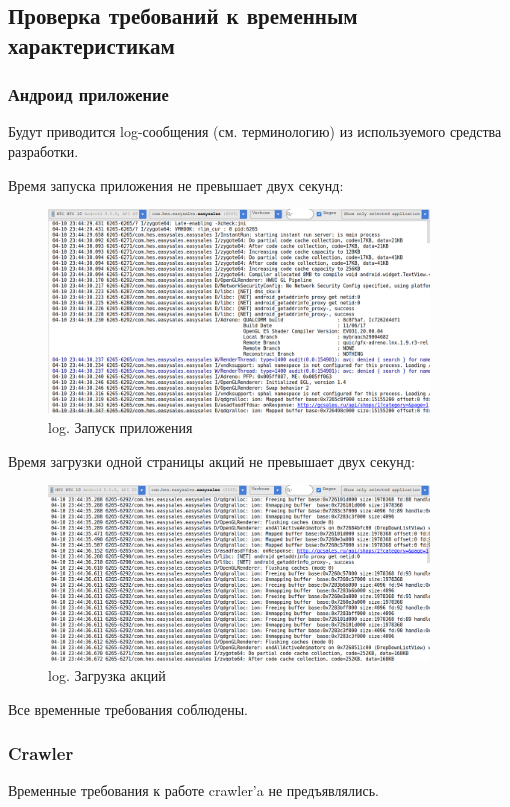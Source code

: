 \newpage
\subsection{Проверка требований к временным характеристикам}
\subsubsection{Андроид приложение}
Будут приводится log-сообщения (см. терминологию) из используемого средства разработки.

Время запуска приложения не превышает двух секунд:

\begin{figure}[h!]
    \centering
    \includegraphics[width=0.9\textwidth]{./screenshots/3/lauch_log.png}
    \caption{\small{log. Запуск приложения}}
\end{figure}


Время загрузки одной страницы акций не превышает двух секунд:

\begin{figure}[h!]
    \centering
    \includegraphics[width=0.9\textwidth]{./screenshots/3/load_log.png}
    \caption{\small{log. Загрузка акций}}
\end{figure}
Все временные требования соблюдены.
\subsubsection{Crawler}
Временные требования к работе crawler'a не предъявлялись.
